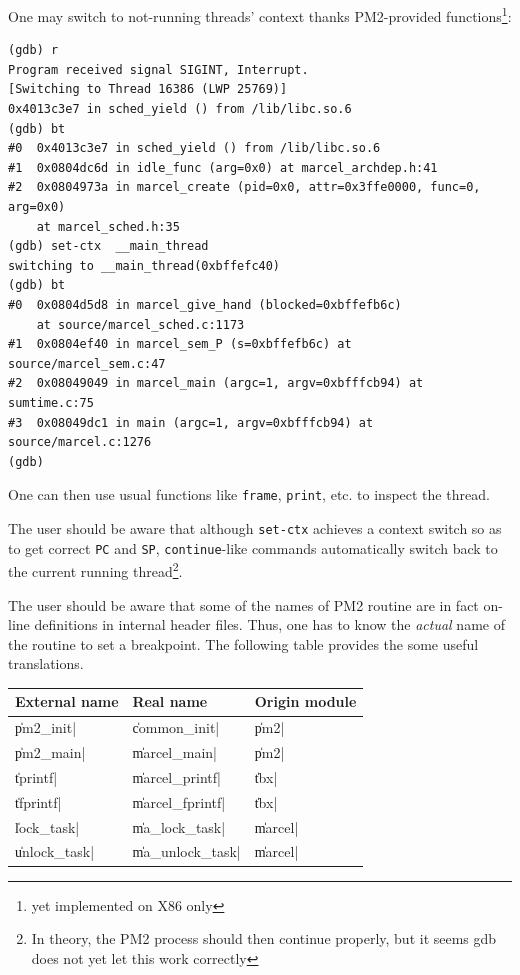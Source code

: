 One may switch to not-running threads' context thanks PM2-provided
functions\footnote{yet implemented on X86 only}:

\begin{verbatim}
(gdb) r
Program received signal SIGINT, Interrupt.
[Switching to Thread 16386 (LWP 25769)]
0x4013c3e7 in sched_yield () from /lib/libc.so.6
(gdb) bt
#0  0x4013c3e7 in sched_yield () from /lib/libc.so.6
#1  0x0804dc6d in idle_func (arg=0x0) at marcel_archdep.h:41
#2  0x0804973a in marcel_create (pid=0x0, attr=0x3ffe0000, func=0, arg=0x0)
    at marcel_sched.h:35
(gdb) set-ctx  __main_thread
switching to __main_thread(0xbffefc40)
(gdb) bt
#0  0x0804d5d8 in marcel_give_hand (blocked=0xbffefb6c)
    at source/marcel_sched.c:1173
#1  0x0804ef40 in marcel_sem_P (s=0xbffefb6c) at source/marcel_sem.c:47
#2  0x08049049 in marcel_main (argc=1, argv=0xbfffcb94) at sumtime.c:75
#3  0x08049dc1 in main (argc=1, argv=0xbfffcb94) at source/marcel.c:1276
(gdb)
\end{verbatim}

One can then use usual functions like \texttt{frame}, \texttt{print},
etc. to inspect the thread.

The user should be aware that although \texttt{set-ctx} achieves a
context switch so as to get correct \texttt{PC} and \texttt{SP},
\texttt{continue}-like commands automatically switch back to the
current running thread\footnote{In theory, the PM2 process should
then continue properly, but it seems gdb does not yet let this work
correctly}.

The user should be aware that some of the names of PM2 routine are in
fact on-line definitions in internal header files. Thus, one has to
know the \emph{actual} name of the routine to set a breakpoint. The
following table provides the some useful translations.
\begin{center}
\begin{tabular}{|l|l|l|}
\hline
External name & Real name & Origin module \\
\hline
\|pm2_init|     & \|common_init|        & \|pm2| \\
\|pm2_main|     & \|marcel_main|        & \|pm2| \\
\hline
\|tprintf|      & \|marcel_printf|      & \|tbx| \\
\|tfprintf|     & \|marcel_fprintf|     & \|tbx| \\
\hline
\|lock_task|    & \|ma_lock_task|       & \|marcel| \\
\|unlock_task|  & \|ma_unlock_task|     & \|marcel| \\
\hline
\end{tabular}
\end{center}



